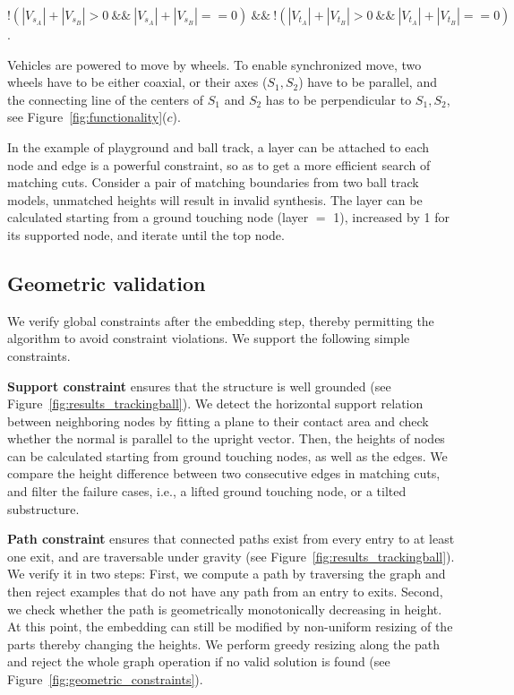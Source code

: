 $!(|V_{s_A}| + |V_{s_B}| > 0\ \&\&\ |V_{s_A}| + |V_{s_B}| == 0)\ \&\&\ !(|V_{t_A}| + |V_{t_B}| > 0\ \&\&\ |V_{t_A}| + |V_{t_B}| == 0)$.


 Vehicles are powered to move by wheels. To enable synchronized move, two wheels have to be either coaxial, or their axes ($S_1, S_2$) have to be parallel, and the connecting line of the centers of $S_1$ and $S_2$ has to be perpendicular to $S_1, S_2$, see Figure~\ref{fig:functionality}($c$).

 In the example of playground and ball track, a layer can be attached to each node and edge is a powerful constraint, so as to get a more efficient search of matching cuts. Consider a pair of matching boundaries from two ball track models, unmatched heights will result in invalid synthesis. The layer can be calculated starting from a ground touching node (layer $=$ 1), increased by 1 for its supported node, and iterate until the top node.

\subsection{Geometric validation}

We verify global constraints after the embedding step, thereby permitting the algorithm to avoid constraint violations. We support the following simple constraints.

\noindent \textbf{Support constraint} ensures that the structure is well grounded (see Figure~\ref{fig:results_trackingball}). We detect the horizontal support relation between neighboring nodes by fitting a plane to their contact area and check whether the normal is parallel to the upright vector. Then, the heights of nodes can be calculated starting from ground touching nodes, as well as the edges. We compare the height difference between two consecutive edges in matching cuts, and filter the failure cases, i.e., a lifted ground touching node, or a tilted substructure.

\noindent \textbf{Path constraint} ensures that connected paths exist from every entry to at least one exit, and are traversable under gravity (see Figure~\ref{fig:results_trackingball}). We verify it in two steps: First, we compute a path by traversing the graph and then reject examples that do not have any path from an entry to exits. Second, we check whether the path is geometrically monotonically decreasing in height. At this point, the embedding can still be modified by non-uniform resizing of the parts thereby changing the heights. We perform greedy resizing along the path and reject the whole graph operation if no valid solution is found (see Figure~\ref{fig:geometric_constraints}).


